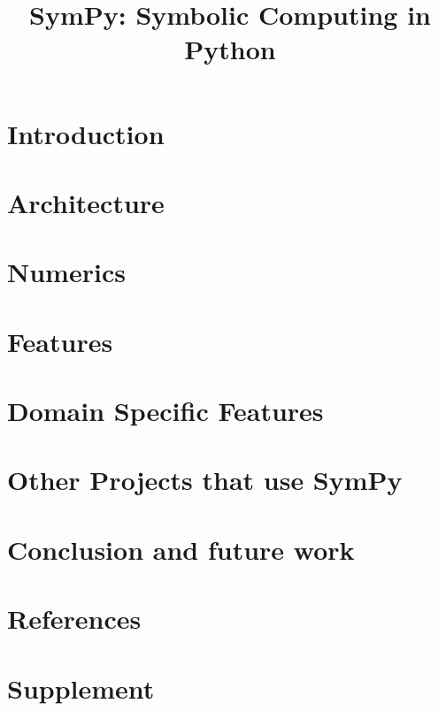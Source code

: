 \documentclass[review]{siamart0216}
\title{SymPy: Symbolic Computing in Python}
\begin{document}
\maketitle

\section{Introduction}




\section{Architecture}



\section{Numerics}




\section{Features}




\section{Domain Specific Features}



\section{Other Projects that use SymPy}



\section{Conclusion and future work}



\section{References}




\section{Supplement}


\end{document}

